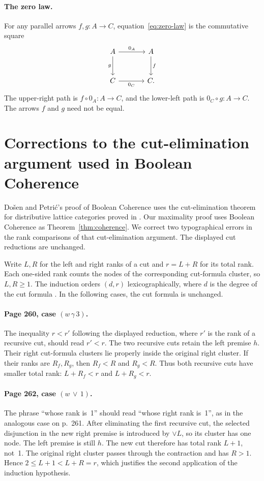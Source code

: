 \documentclass[11pt]{article}
\begin{document}
\paragraph{The zero law.}
For any parallel arrows $f,g:A\to C$,
equation~\eqref{eq:zero-law} is the commutative square
\[
\begin{tikzcd}[column sep=large,row sep=large]
 A\arrow[r,"0_A"]\arrow[d,"g"']&A\arrow[d,"f"]\\
 C\arrow[r,"0_C"']&C.
\end{tikzcd}
\]
The upper-right path is $f\circ0_A:A\to C$, and the lower-left
path is $0_C\circ g:A\to C$. The arrows $f$ and $g$ need not be equal.

\clearpage
\section{Corrections to the cut-elimination argument used in Boolean Coherence}
\label{app:cut-errata}

Do\v{s}en and Petri\'c's proof of Boolean Coherence
\cite[\S14.2]{DP} uses the cut-elimination theorem for distributive
lattice categories proved in \cite[\S11.2]{DP}.
Our maximality proof uses Boolean Coherence as
Theorem~\ref{thm:coherence}.
We correct two typographical errors in the rank comparisons of
that cut-elimination argument. The displayed cut reductions are unchanged.

Write $L,R$ for the left and right ranks of a cut and $r=L+R$
for its total rank. Each one-sided rank counts the nodes of the
corresponding cut-formula cluster, so $L,R\geq1$.
The induction orders $(d,r)$ lexicographically, where $d$ is the
degree of the cut formula \cite[pp.~249,253]{DP}.
In the following cases, the cut formula is unchanged.

\paragraph{Page 260, case $(w\,\gamma\,3)$.}
The inequality $r<r'$ following the displayed reduction, where $r'$
is the rank of a recursive cut, should read $r'<r$.
The two recursive cuts retain the left premise $h$.
Their right cut-formula clusters lie properly inside the original
right cluster. If their ranks are $R_f,R_g$, then
$R_f<R$ and $R_g<R$. Thus both recursive cuts have smaller total
rank: $L+R_f<r$ and $L+R_g<r$.

\paragraph{Page 262, case $(w\,\vee\,1)$.}
The phrase ``whose rank is~1'' should read ``whose right rank
is~1'', as in the analogous case on p.~261.
After eliminating the first recursive cut, the selected disjunction
in the new right premise is introduced by $\vee L$, so its
cluster has one node. The left premise is still $h$.
The new cut therefore has total rank $L+1$, not~1.
The original right cluster passes through the contraction and has
$R>1$. Hence $2\leq L+1<L+R=r$, which justifies the second
application of the induction hypothesis.
\end{document}
